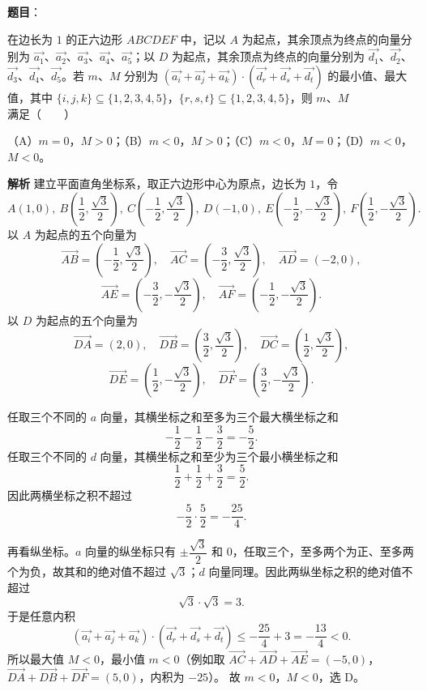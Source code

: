 \begin{answer}

\textbf{题目}：

在边长为 $1$ 的正六边形 $ABCDEF$ 中，记以 $A$ 为起点，其余顶点为终点的向量分别为 $\overrightarrow{a_1}$、$\overrightarrow{a_2}$、$\overrightarrow{a_3}$、$\overrightarrow{a_4}$、$\overrightarrow{a_5}$；以 $D$ 为起点，其余顶点为终点的向量分别为 $\overrightarrow{d_1}$、$\overrightarrow{d_2}$、$\overrightarrow{d_3}$、$\overrightarrow{d_4}$、$\overrightarrow{d_5}$。若 $m$、$M$ 分别为 $(\overrightarrow{a_i}+\overrightarrow{a_j}+\overrightarrow{a_k})\cdot(\overrightarrow{d_r}+\overrightarrow{d_s}+\overrightarrow{d_t})$ 的最小值、最大值，其中 $\{i,j,k\}\subseteq\{1,2,3,4,5\}$，$\{r,s,t\}\subseteq\{1,2,3,4,5\}$，则 $m$、$M$ 满足\mbox{（　　）}

（A）$m=0$，$M>0$；（B）$m<0$，$M>0$；（C）$m<0$，$M=0$；（D）$m<0$，$M<0$。

\textbf{解析}
建立平面直角坐标系，取正六边形中心为原点，边长为 $1$，令
\nopagebreak[4]
\[A(1,0),\ B\left(\frac12,\frac{\sqrt3}{2}\right),\ C\left(-\frac12,\frac{\sqrt3}{2}\right),\ D(-1,0),\ E\left(-\frac12,-\frac{\sqrt3}{2}\right),\ F\left(\frac12,-\frac{\sqrt3}{2}\right).\]
以 $A$ 为起点的五个向量为
\nopagebreak[4]
\[\overrightarrow{AB}=\left(-\frac12,\frac{\sqrt3}{2}\right),\quad
\overrightarrow{AC}=\left(-\frac32,\frac{\sqrt3}{2}\right),\quad
\overrightarrow{AD}=(-2,0),\]
\nopagebreak[4]
\[\overrightarrow{AE}=\left(-\frac32,-\frac{\sqrt3}{2}\right),\quad
\overrightarrow{AF}=\left(-\frac12,-\frac{\sqrt3}{2}\right).\]
以 $D$ 为起点的五个向量为
\nopagebreak[4]
\[\overrightarrow{DA}=(2,0),\quad
\overrightarrow{DB}=\left(\frac32,\frac{\sqrt3}{2}\right),\quad
\overrightarrow{DC}=\left(\frac12,\frac{\sqrt3}{2}\right),\]
\nopagebreak[4]
\[\overrightarrow{DE}=\left(\frac12,-\frac{\sqrt3}{2}\right),\quad
\overrightarrow{DF}=\left(\frac32,-\frac{\sqrt3}{2}\right).\]

任取三个不同的 $a$ 向量，其横坐标之和至多为三个最大横坐标之和
\nopagebreak[4]
\[-\frac12-\frac12-\frac32=-\frac52.\]
任取三个不同的 $d$ 向量，其横坐标之和至少为三个最小横坐标之和
\nopagebreak[4]
\[\frac12+\frac12+\frac32=\frac52.\]
因此两横坐标之积不超过
\nopagebreak[4]
\[-\frac52\cdot\frac52=-\frac{25}{4}.\]

再看纵坐标。$a$ 向量的纵坐标只有 $\pm\dfrac{\sqrt3}{2}$ 和 $0$，任取三个，至多两个为正、至多两个为负，故其和的绝对值不超过 $\sqrt3$；$d$ 向量同理。因此两纵坐标之积的绝对值不超过
\nopagebreak[4]
\[\sqrt3\cdot\sqrt3=3.\]
于是任意内积
\nopagebreak[4]
\[\left(\overrightarrow{a_i}+\overrightarrow{a_j}+\overrightarrow{a_k}\right)\cdot
\left(\overrightarrow{d_r}+\overrightarrow{d_s}+\overrightarrow{d_t}\right)
\leqslant-\frac{25}{4}+3=-\frac{13}{4}<0.\]
所以最大值 $M<0$，最小值 $m<0$（例如取
$\overrightarrow{AC}+\overrightarrow{AD}+\overrightarrow{AE}=(-5,0)$，
$\overrightarrow{DA}+\overrightarrow{DB}+\overrightarrow{DF}=(5,0)$，内积为 $-25$）。
故 $m<0$，$M<0$，选 D。


\end{answer}
